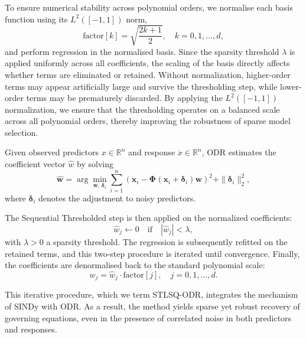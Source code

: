 To ensure numerical stability across polynomial orders, we normalise each basis function using its $L^2([-1,1])$ norm,
\begin{equation}
    \mathrm{factor}[k] = \sqrt{\frac{2k+1}{2}}, \quad k=0,1,\dots,d,
\end{equation}
and perform regression in the normalised basis. Since the sparsity threshold $\lambda$ is applied uniformly across all coefficients, the scaling of the basis directly affects whether terms are eliminated or retained. Without normalization, higher-order terms may appear artificially large and survive the thresholding step, while lower-order terms may be prematurely discarded. By applying the $L^2([-1,1])$ normalization, we ensure that the thresholding operates on a balanced scale across all polynomial orders, thereby improving the robustness of sparse model selection. 

Given observed predictors $x \in \mathbb{R}^n$ and response $\dot{x} \in \mathbb{R}^n$, ODR estimates the coefficient vector $\hat{w}$ by solving
\begin{equation}
    \hat{\boldsymbol{w}} = \arg\min_{\boldsymbol{w},\,\boldsymbol{\delta}_i} \sum_{i=1}^n \left( \dot{\boldsymbol{x}}_i - \mathbf{\Phi}(\boldsymbol{x}_i + \boldsymbol{\delta}_i)\boldsymbol{w} \right)^2 + \|\boldsymbol{\delta}_i\|_2^2,
\end{equation}
where $\boldsymbol{\delta}_i$ denotes the adjustment to noisy predictors. 

The Sequential Thresholded step is then applied on the normalized coefficients:  
\begin{equation}
    \hat{w}_j \leftarrow 0 \quad \text{if} \quad |\hat{w}_j| < \lambda,
\end{equation}
with $\lambda > 0$ a sparsity threshold. The regression is subsequently refitted on the retained terms, and this two-step procedure is iterated until convergence. Finally, the coefficients are denormalised back to the standard polynomial scale:
\begin{equation}
    w_j = \hat{w}_j \cdot \mathrm{factor}[j], \quad j=0,1,\dots,d.
\end{equation}

This iterative procedure, which we term STLSQ-ODR, integrates the mechanism of SINDy with ODR. As a result, the method yields sparse yet robust recovery of governing equations, even in the presence of correlated noise in both predictors and responses.


